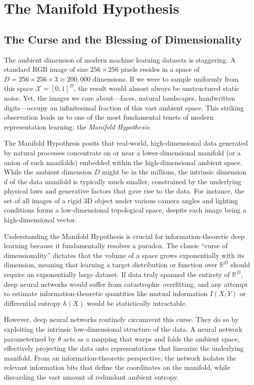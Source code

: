 \chapter{The Manifold Hypothesis}
\label{chap:manifold}

\section{The Curse and the Blessing of Dimensionality}

The ambient dimension of modern machine learning datasets is staggering. A standard RGB image of size $256 \times 256$ pixels resides in a space of $D = 256 \times 256 \times 3 \approx 200,000$ dimensions. If we were to sample uniformly from this space $\mathcal{X} = [0, 1]^D$, the result would almost always be unstructured static noise. Yet, the images we care about---faces, natural landscapes, handwritten digits---occupy an infinitesimal fraction of this vast ambient space. This striking observation leads us to one of the most fundamental tenets of modern representation learning: the \emph{Manifold Hypothesis}.

The Manifold Hypothesis posits that real-world, high-dimensional data generated by natural processes concentrate on or near a lower-dimensional manifold (or a union of such manifolds) embedded within the high-dimensional ambient space. While the ambient dimension $D$ might be in the millions, the intrinsic dimension $d$ of the data manifold is typically much smaller, constrained by the underlying physical laws and generative factors that gave rise to the data. For instance, the set of all images of a rigid 3D object under various camera angles and lighting conditions forms a low-dimensional topological space, despite each image being a high-dimensional vector.

Understanding the Manifold Hypothesis is crucial for information-theoretic deep learning because it fundamentally resolves a paradox. The classic ``curse of dimensionality'' dictates that the volume of a space grows exponentially with its dimension, meaning that learning a target distribution or function over $\mathbb{R}^D$ should require an exponentially large dataset. If data truly spanned the entirety of $\mathbb{R}^D$, deep neural networks would suffer from catastrophic overfitting, and any attempt to estimate information-theoretic quantities like mutual information $I(X;Y)$ or differential entropy $h(X)$ would be statistically intractable. 

However, deep neural networks routinely circumvent this curse. They do so by exploiting the intrinsic low-dimensional structure of the data. A neural network parameterized by $\theta$ acts as a mapping that warps and folds the ambient space, effectively projecting the data onto representations that linearize the underlying manifold. From an information-theoretic perspective, the network isolates the relevant information bits that define the coordinates on the manifold, while discarding the vast amount of redundant ambient entropy.

